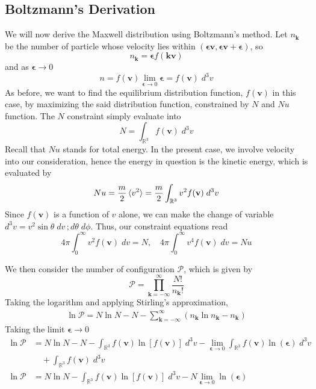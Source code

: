 \documentclass[../../../Main.tex]{subfiles}
\begin{document}
\subsection{Boltzmann's Derivation}
We will now derive the Maxwell distribution using Boltzmann's method. Let $n_\mathbf{k}$ be the number of particle whose velocity lies within $(\boldsymbol{\epsilon}\mathbf{v},\boldsymbol{\epsilon}\mathbf{v}+\boldsymbol{\epsilon})$, so
\begin{equation*}
    n_\mathbf{k}=\boldsymbol{\epsilon}f(\mathbf{kv})
\end{equation*}
and as $\boldsymbol{\epsilon}\rightarrow0$
\begin{equation*}
    n=f(\mathbf{v})\lim_{\boldsymbol{\epsilon}\rightarrow0}\boldsymbol{\epsilon}=f(\mathbf{v})\;d^3v
\end{equation*}
As before, we want to find the equilibrium distribution function, $f(\mathbf{ v})$ in this case, by maximizing the said distribution function, constrained by $N$ and $Nu$ function. The $N$ constraint simply evaluate into 
\begin{equation*}
    N=\int_{\mathbb{R}^3}  f(\mathbf{v})\;d^3v
\end{equation*}
Recall that $Nu$ stands for total energy. In the present case, we involve velocity into our consideration, hence the energy in question is the kinetic energy, which is evaluated by
\begin{equation*}
    Nu=\frac{m}{2}\braket{v^2}=\frac{m}{2}\int_{\mathbb{R}^3} v^2f(\mathbf{v})\;d^3v
\end{equation*} 
Since $f(\mathbf{v})$ is a function of $v$ alone, we can make the change of variable $d^3v=v^2\sin\theta\;dv\,; d\theta\; d\phi$. Thus, our constraint equations read
\begin{equation*}
    4\pi\int_{0}^{\infty}v^2f(\mathbf{v})\;dv=N, \quad 4\pi \int_{0}^{\infty}v^4f(\mathbf{v})\;dv=Nu
\end{equation*}

We then consider the number of configuration $\mathcal{P}$, which is given by 
\begin{equation*}
    \mathcal{P}=\prod_{\mathbf{k}=-\infty}^{\infty}\frac{N!}{n_\mathbf{k}!}
\end{equation*}
Taking the logarithm and applying Stirling's approximation,
\begin{align*}
    \ln \mathcal{P}=N\ln N-N-\sum_{\mathbf{k=-\infty}}^{\infty}\left(n_\mathbf{k}\ln n_\mathbf{k}-n_\mathbf{k} \right)
\end{align*}
Taking the limit $\boldsymbol{\epsilon}\rightarrow0$
\begin{align*}
    \ln \mathcal{P}&=N\ln N-N - \int_{\mathbb{R}^3}f(\mathbf{v})\ln [f(\mathbf{v})]\;d^3v - \lim_{\boldsymbol{\epsilon}\rightarrow0} \int_{\mathbb{R}^3}f(\mathbf{v})\ln (\boldsymbol{\epsilon})\;d^3v\\
    &\quad+\int_{\mathbb{R}^3}f(\mathbf{v})\;d^3v\\
    \ln \mathcal{P}&=N\ln N - \int_{\mathbb{R}^3}f(\mathbf{v})\ln [f(\mathbf{v})]\;d^3v -N\lim_{\boldsymbol{\epsilon}\rightarrow0}\ln (\boldsymbol{\epsilon})
\end{align*}
\end{document}
